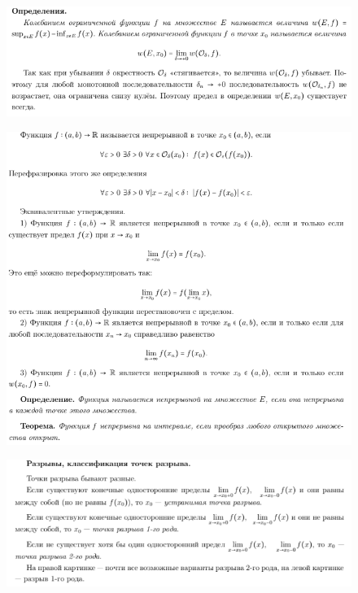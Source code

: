 \begin{figure}[h!]
\centering
\includegraphics[scale=0.6]{Pictures/28_1.png}
\end{figure}
 \begin{figure}[h!]
\centering
\includegraphics[scale=0.65]{Pictures/28_2.png}
\end{figure}
\begin{figure}[h!]
\centering
\includegraphics[scale=0.65]{Pictures/28_3.png}
\end{figure}
\newpage

